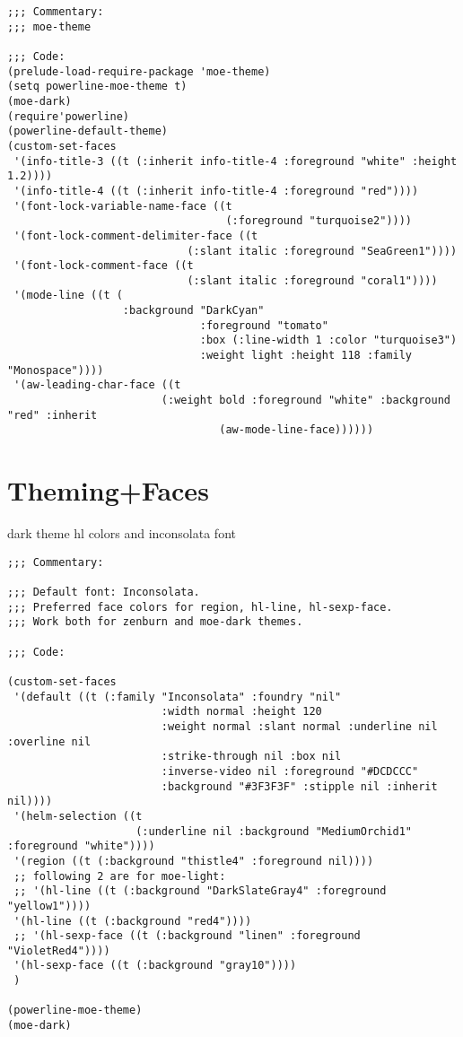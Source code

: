 \documentclass[11pt]{article}
\begin{document}
\begin{verbatim}
;;; Commentary:
;;; moe-theme

;;; Code:
(prelude-load-require-package 'moe-theme)
(setq powerline-moe-theme t)
(moe-dark)
(require'powerline)
(powerline-default-theme)
(custom-set-faces
 '(info-title-3 ((t (:inherit info-title-4 :foreground "white" :height 1.2))))
 '(info-title-4 ((t (:inherit info-title-4 :foreground "red"))))
 '(font-lock-variable-name-face ((t
                                  (:foreground "turquoise2"))))
 '(font-lock-comment-delimiter-face ((t
                            (:slant italic :foreground "SeaGreen1"))))
 '(font-lock-comment-face ((t
                            (:slant italic :foreground "coral1"))))
 '(mode-line ((t (
                  :background "DarkCyan"
                              :foreground "tomato"
                              :box (:line-width 1 :color "turquoise3")
                              :weight light :height 118 :family "Monospace"))))
 '(aw-leading-char-face ((t
                        (:weight bold :foreground "white" :background "red" :inherit
                                 (aw-mode-line-face))))))
\end{verbatim}

\section{Theming+Faces}
\label{sec:org0c7471a}

dark theme hl colors and inconsolata font

\begin{verbatim}
;;; Commentary:

;;; Default font: Inconsolata.
;;; Preferred face colors for region, hl-line, hl-sexp-face.
;;; Work both for zenburn and moe-dark themes.

;;; Code:

(custom-set-faces
 '(default ((t (:family "Inconsolata" :foundry "nil"
                        :width normal :height 120
                        :weight normal :slant normal :underline nil :overline nil
                        :strike-through nil :box nil
                        :inverse-video nil :foreground "#DCDCCC"
                        :background "#3F3F3F" :stipple nil :inherit nil))))
 '(helm-selection ((t
                    (:underline nil :background "MediumOrchid1" :foreground "white"))))
 '(region ((t (:background "thistle4" :foreground nil))))
 ;; following 2 are for moe-light:
 ;; '(hl-line ((t (:background "DarkSlateGray4" :foreground "yellow1"))))
 '(hl-line ((t (:background "red4"))))
 ;; '(hl-sexp-face ((t (:background "linen" :foreground "VioletRed4"))))
 '(hl-sexp-face ((t (:background "gray10"))))
 )

(powerline-moe-theme)
(moe-dark)
\end{verbatim}
\end{document}
